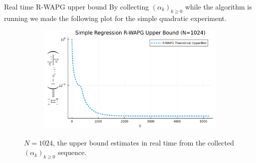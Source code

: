 \documentclass[11pt]{beamer}
\theoremstyle{definition}
\begin{document}
    \begin{frame}{Real time R-WAPG upper bound}
        By collecting $(\alpha_k)_{k \ge 0}$ while the algorithm is running we made the following plot for the simple quadratic experiment. 
        \begin{figure}[H]
            \centering
            \begin{subfigure}[b]{0.75\textwidth}
                \centering
                \includegraphics[width=\textwidth]{
                    assets/simple_regression_rwapg_upperbnd_1024.png
                }
            \end{subfigure}
            \caption{
                $N = 1024$, the upper bound estimates in real time from the collected $(\alpha_k)_{k \ge 0}$ sequence. 
            }
            \label{fig:simple-quadratic-r-wapg-rwapg-upperbnd}
        \end{figure}
    \end{frame} 
\end{document}

